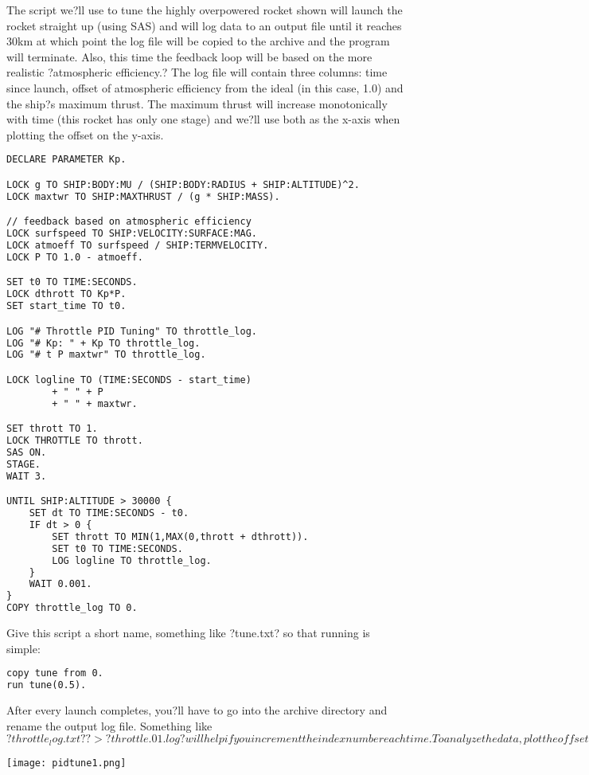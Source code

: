 The script we?ll use to tune the highly overpowered rocket shown will launch the rocket straight up (using SAS) and will log data to an output file until it reaches 30km at which point the log file will be copied to the archive and the program will terminate. Also, this time the feedback loop will be based on the more realistic ?atmospheric efficiency.? The log file will contain three columns: time since launch, offset of atmospheric efficiency from the ideal (in this case, 1.0) and the ship?s maximum thrust. The maximum thrust will increase monotonically with time (this rocket has only one stage) and we?ll use both as the x-axis when plotting the offset on the y-axis.

\begin{lstlisting}[frame=single,language=XML]
DECLARE PARAMETER Kp.

LOCK g TO SHIP:BODY:MU / (SHIP:BODY:RADIUS + SHIP:ALTITUDE)^2.
LOCK maxtwr TO SHIP:MAXTHRUST / (g * SHIP:MASS).

// feedback based on atmospheric efficiency
LOCK surfspeed TO SHIP:VELOCITY:SURFACE:MAG.
LOCK atmoeff TO surfspeed / SHIP:TERMVELOCITY.
LOCK P TO 1.0 - atmoeff.

SET t0 TO TIME:SECONDS.
LOCK dthrott TO Kp*P.
SET start_time TO t0.

LOG "# Throttle PID Tuning" TO throttle_log.
LOG "# Kp: " + Kp TO throttle_log.
LOG "# t P maxtwr" TO throttle_log.

LOCK logline TO (TIME:SECONDS - start_time)
        + " " + P
        + " " + maxtwr.

SET thrott TO 1.
LOCK THROTTLE TO thrott.
SAS ON.
STAGE.
WAIT 3.

UNTIL SHIP:ALTITUDE > 30000 {
    SET dt TO TIME:SECONDS - t0.
    IF dt > 0 {
        SET thrott TO MIN(1,MAX(0,thrott + dthrott)).
        SET t0 TO TIME:SECONDS.
        LOG logline TO throttle_log.
    }
    WAIT 0.001.
}
COPY throttle_log TO 0.
\end{lstlisting} 

Give this script a short name, something like ?tune.txt? so that running is simple:

\begin{lstlisting}[frame=single,language=XML]
copy tune from 0.
run tune(0.5).
\end{lstlisting} 

After every launch completes, you?ll have to go into the archive directory and rename the output log file. Something like $?throttle_log.txt? ?> ?throttle.01.log? will help if you increment the index number each time. To analyze the data, plot the offset (P) as a function of time (t). Here, we show the results for three values of Kp: 0.002, 0.016 and 0.160, including the maximum TWR when Kp = 0.002 as the top x-axis. The maximum TWR dependence on time is different for the three values of Kp, but not by a lot.
$
\begin{center}
\texttt{[image: pidtune1.png]}
\end{center}

